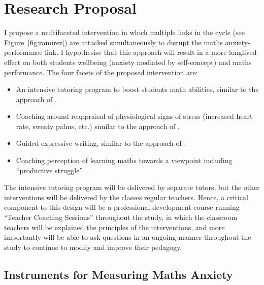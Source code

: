 \documentclass[twoside,12pt,a4paper]{report}
\newcommand{\reffig}[1]{\hyperref[fig:#1]{Figure~\ref{fig:#1}}}
\begin{document}
\section{Research Proposal}

I propose a multifaceted intervention in which multiple links in the cycle (see \reffig{ramirez}) are attacked simultaneously to disrupt the maths anxiety-performance link. I hypothesise that this approach will result in a more longlived effect on both students wellbeing (anxiety mediated by self-concept) and maths performance. The four facets of the proposed intervention are:
\begin{itemize}
	\item An intensive tutoring program to boost students math abilities, similar to the approach of .
	\item Coaching around reappraisal of physiological signs of stress (increased heart rate, sweaty palms, etc.) similar to the approach of .
	\item Guided expressive writing, similar to the approach of .
	\item Coaching perception of learning maths towards a viewpoint including ``productive struggle'' \cite{Hiebert2007}.
\end{itemize}

The intensive tutoring program will be delivered by separate tutors, but the other interventions will be delivered by the classes regular teachers. Hence, a critical component to this design will be a professional development course running ``Teacher Coaching Sessions'' throughout the study, in which the classroom teachers will be explained the principles of the interventions, and more importantly will be able to ask questions in an ongoing manner throughout the study to continue to modify and improve their pedagogy.

\subsection*{Instruments for Measuring Maths Anxiety}
\end{document}
